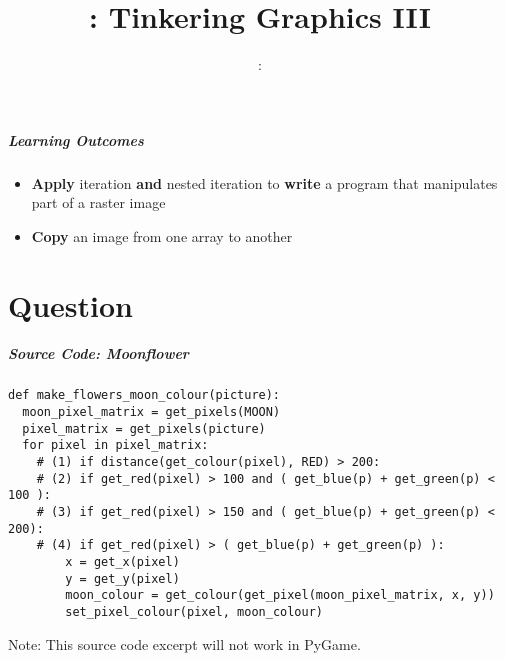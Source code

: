 \usepackage{../../beamerthemeFalmouthGamesAcademy}
\usepackage{multimedia}
\graphicspath{ {../../} }


\usepackage[normalem]{ulem}
\usepackage{wasysym}

\usepackage{pdfpages}

\usetikzlibrary{arrows,automata}







\title{\sessionnumber: Tinkering Graphics III}
\subtitle{\modulecode: \moduletitle}

\frame{\titlepage} 

\begin{frame}
	\frametitle{Learning Outcomes}
	\begin{itemize}
		\item \textbf{Apply} iteration \textbf{and} nested iteration to \textbf{write} a program that manipulates part of a raster image
		\item \textbf{Copy} an image from one array to another
	\end{itemize}
\end{frame}

\part{Question}
\frame{\partpage}


\begin{frame}[fragile]
	\frametitle{Source Code: Moonflower}
	
\begin{lstlisting}
def make_flowers_moon_colour(picture):
  moon_pixel_matrix = get_pixels(MOON)
  pixel_matrix = get_pixels(picture)
  for pixel in pixel_matrix:
    # (1) if distance(get_colour(pixel), RED) > 200:
    # (2) if get_red(pixel) > 100 and ( get_blue(p) + get_green(p) < 100 ):
    # (3) if get_red(pixel) > 150 and ( get_blue(p) + get_green(p) < 200):
    # (4) if get_red(pixel) > ( get_blue(p) + get_green(p) ):
        x = get_x(pixel)
        y = get_y(pixel)
        moon_colour = get_colour(get_pixel(moon_pixel_matrix, x, y))
        set_pixel_colour(pixel, moon_colour)
\end{lstlisting}

Note: This source code excerpt will not work in PyGame.

\end{frame}

